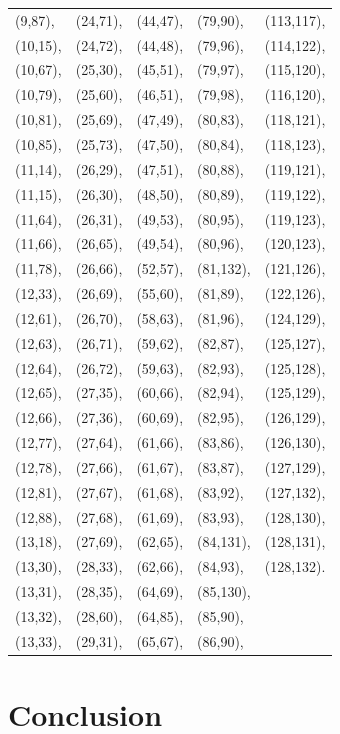 \documentclass[twocolumn]{svjour3}
\begin{document}
\begin{center}
\begin{supertabular}[tb]{l l l l l}
(9,87),&(24,71),&(44,47),&(79,90),&(113,117),\\
(10,15),&(24,72),&(44,48),&(79,96),&(114,122),\\
(10,67),&(25,30),&(45,51),&(79,97),&(115,120),\\
(10,79),&(25,60),&(46,51),&(79,98),&(116,120),\\
(10,81),&(25,69),&(47,49),&(80,83),&(118,121),\\
(10,85),&(25,73),&(47,50),&(80,84),&(118,123),\\
(11,14),&(26,29),&(47,51),&(80,88),&(119,121),\\
(11,15),&(26,30),&(48,50),&(80,89),&(119,122),\\
(11,64),&(26,31),&(49,53),&(80,95),&(119,123),\\
(11,66),&(26,65),&(49,54),&(80,96),&(120,123),\\
(11,78),&(26,66),&(52,57),&(81,132),&(121,126),\\
(12,33),&(26,69),&(55,60),&(81,89),&(122,126),\\
(12,61),&(26,70),&(58,63),&(81,96),&(124,129),\\
(12,63),&(26,71),&(59,62),&(82,87),&(125,127),\\
(12,64),&(26,72),&(59,63),&(82,93),&(125,128),\\
(12,65),&(27,35),&(60,66),&(82,94),&(125,129),\\
(12,66),&(27,36),&(60,69),&(82,95),&(126,129),\\
(12,77),&(27,64),&(61,66),&(83,86),&(126,130),\\
(12,78),&(27,66),&(61,67),&(83,87),&(127,129),\\
(12,81),&(27,67),&(61,68),&(83,92),&(127,132),\\
(12,88),&(27,68),&(61,69),&(83,93),&(128,130),\\
(13,18),&(27,69),&(62,65),&(84,131),&(128,131),\\
(13,30),&(28,33),&(62,66),&(84,93),&(128,132).  \\
(13,31),&(28,35),&(64,69),&(85,130),&\\
(13,32),&(28,60),&(64,85),&(85,90),&\\
(13,33),&(29,31),&(65,67),&(86,90),&\\
\end{supertabular}
\end{center}


	\section{Conclusion}
	\label{sect:discussion}
\end{document}
